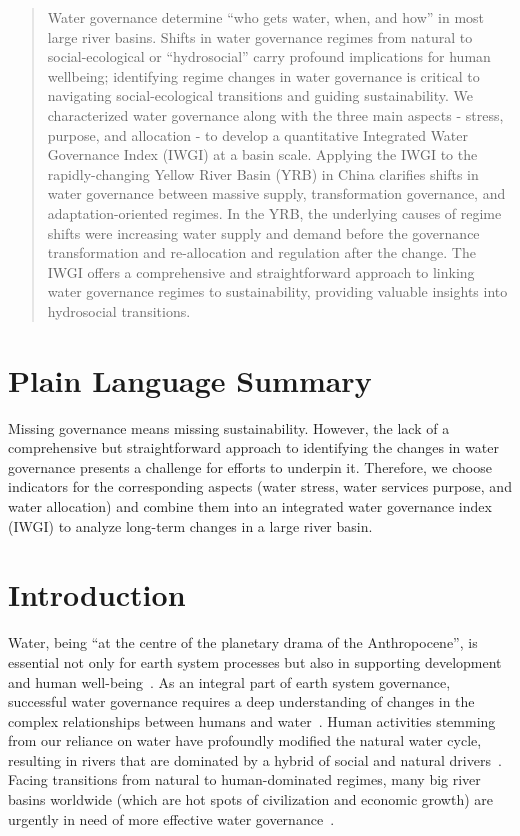 \documentclass[draft]{../agujournal2019}
\begin{document}
\begin{abstract}
Water governance determine ``who gets water, when, and how'' in most large river basins.
Shifts in water governance regimes from natural to social-ecological or ``hydrosocial'' carry profound implications for human wellbeing; identifying regime changes in water governance is critical to navigating social-ecological transitions and guiding sustainability.
We characterized water governance along with the three main aspects - stress, purpose, and allocation - to develop a quantitative Integrated Water Governance Index (IWGI) at a basin scale.
Applying the IWGI to the rapidly-changing Yellow River Basin (YRB) in China clarifies shifts in water governance between massive supply, transformation governance, and adaptation-oriented regimes.
In the YRB, the underlying causes of regime shifts were increasing water supply and demand before the governance transformation and re-allocation and regulation after the change.
The IWGI offers a comprehensive and straightforward approach to linking water governance regimes to sustainability, providing valuable insights into hydrosocial transitions.
\end{abstract}

\section*{Plain Language Summary}
Missing governance means missing sustainability. However, the lack of a comprehensive but straightforward approach to identifying the changes in water governance presents a challenge for efforts to underpin it. Therefore, we choose indicators for the corresponding aspects (water stress, water services purpose, and water allocation) and combine them into an integrated water governance index (IWGI) to analyze long-term changes in a large river basin.


\section{Introduction}\label{sec1}

Water, being ``at the centre of the planetary drama of the Anthropocene'', is essential not only for earth system processes but also in supporting development and human well-being~\cite{gleeson2020a,gleeson2020b}.
As an integral part of earth system governance, successful water governance requires a deep understanding of changes in the complex relationships between humans and water~\cite{ahlstrom2021,biermann2012,steffen2020}.
Human activities stemming from our reliance on water have profoundly modified the natural water cycle, resulting in rivers that are dominated by a hybrid of social and natural drivers~\cite{sivapalan2012,qin2014a,abbott2019}.
Facing transitions from natural to human-dominated regimes, many big river basins worldwide (which are hot spots of civilization and economic growth) are urgently in need of more effective water governance~\cite{best2019,dibaldassarre2019}.
\end{document}
